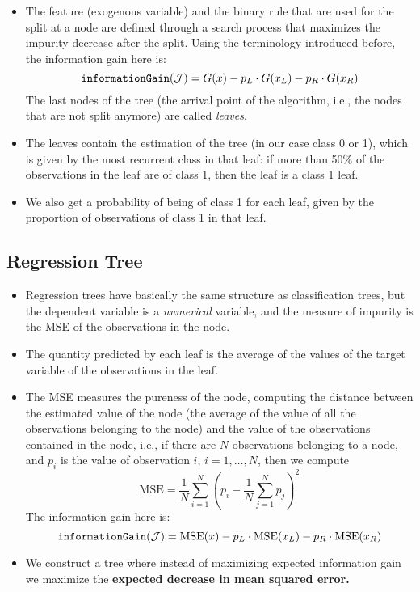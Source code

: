 \begin{itemize}
    \item The feature (exogenous variable) and the binary rule that are used for the split at a node are defined through a search process that maximizes the impurity decrease after the split. Using the terminology introduced before, the information gain here is:
    \begin{equation*}
        \texttt{informationGain}(\mathcal{J}) = G(x) -p_{L} \cdot G(x_{L}) -p_{R} \cdot G(x_{R})
    \end{equation*}
    The last nodes of the tree (the arrival point of the algorithm, i.e., the nodes that are not split anymore) are called \textit{leaves}. 
    \item The leaves contain the estimation of the tree (in our case class 0 or 1), which is given by the most recurrent class in that leaf: if more than 50\% of the observations in the leaf are of class 1, then the leaf is a class 1 leaf.
    \item We also get a probability of being of class 1 for each leaf, given by the proportion of observations of class 1 in that leaf.
\end{itemize}

\subsection{Regression Tree}

\begin{itemize}
    \item Regression trees have basically the same structure as classification trees, but the dependent variable is a \emph{numerical} variable, and the measure of impurity is the MSE of the observations in the node. 
    \item The quantity predicted by each leaf is the average of the values of the target variable of the observations in the leaf.
    \item The MSE measures the pureness of the node, computing the distance between the estimated value of the node (the average of the value of all the observations belonging to the node) and the value of the observations contained in the node, i.e., if there are $N$ observations belonging to a node, and $p_i$ is the value of observation $i$, $i=1,\dotsc,N$, then we compute
    \begin{equation*}
        \text{MSE} = \frac{1}{N}\sum\limits _{i=1}^{N}\left(p_{i} -\frac{1}{N}\sum\limits _{j=1}^{N} p_{j}\right)^{2}
    \end{equation*}
    The information gain here is:
    \[
        \texttt{informationGain}(\mathcal{J}) = \text{MSE}(x) - p_{L} \cdot \text{MSE}(x_{L}) - p_{R} \cdot \text{MSE}(x_{R})
    \]
    \item We construct a tree where instead of maximizing expected information gain we maximize the \textbf{expected decrease in mean squared error.}
\end{itemize}

